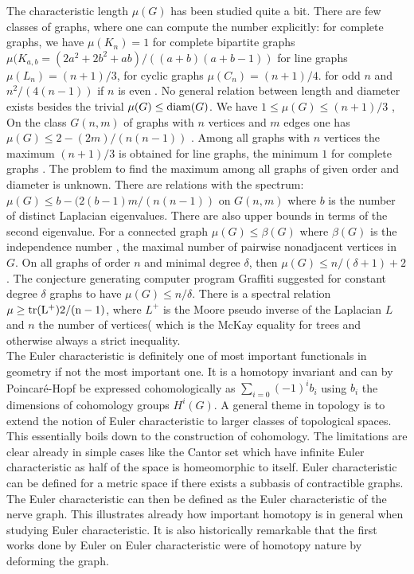 \documentclass[12pt]{amsart}
\theoremstyle{definition}
\def\tr{\rm{tr}} \def\Det{\rm{Det}} \def\ind{\rm{ind}} \def\dim{\rm{dim}} \def\ker{\rm{ker}}
\begin{document}
The characteristic length $\mu(G)$ has been studied quite a bit. There are few classes of
graphs, where one can compute the number explicitly: for complete graphs, we have 
$\mu(K_n)=1$ for complete bipartite graphs $\mu(K_{a,b} = (2a^2+2b^2+ab)/((a+b)(a+b-1))$
for line graphs $\mu(L_n) = (n+1)/3$, for cyclic graphs $\mu(C_n) = (n+1)/4$.
for odd $n$ and $n^2/(4 (n-1))$ if $n$ is even \cite{EntringerJacksonSnyder}.
No general relation between length and diameter exists besides the trivial $\mu(G) \leq {\rm diam}(G)$. 
We have $1 \leq \mu(G) \leq (n+1)/3$ \cite{DoyleGraver1},
On the class $G(n,m)$ of graphs with $n$ vertices and $m$ edges
one has $\mu(G) \leq 2 - (2m)/(n(n-1))$ \cite{EntringerJacksonSnyder}.
Among all graphs with $n$ vertices the maximum $(n+1)/3$ is obtained for line graphs, the minimum $1$ 
for complete graphs \cite{DoyleGraver1}. The problem to find the maximum among all graphs of given 
order and diameter is unknown. There are relations with the spectrum: $\mu(G) \leq b-(2(b-1)m/(n(n-1))$ on $G(n,m)$
where $b$ is the number of distinct Laplacian eigenvalues. There are also upper bounds in terms of the second
eigenvalue.  
For a connected graph $\mu(G) \leq \beta(G)$ where $\beta(G)$ is the independence number \cite{Chung1988},
the maximal number of pairwise nonadjacent vertices in $G$. 
On all graphs of order $n$ and minimal degree $\delta$, then $\mu(G) \leq n/(\delta + 1) + 2$ \cite{KouiderWinkler}.
The conjecture generating computer program Graffiti \cite{Fajtlowicz}
suggested for constant degree $\delta$ graphs to have $\mu(G) \leq n/\delta$.
There is a spectral relation$\mu \geq \tr(L^+) 2/(n-1)$, where
$L^+$ is the Moore pseudo inverse of the Laplacian $L$ and $n$ the number of vertices( \cite{Sivasubramanian}
which is the McKay equality for trees and otherwise always a strict inequality.  \\

The Euler characteristic is definitely one of most important functionals in geometry if not the 
most important one. It is a homotopy invariant and can by Poincar\'e-Hopf be expressed cohomologically 
as $\sum_{i=0} (-1)^i b_i$ using $b_i$ the dimensions of cohomology groups $H^i(G)$. 
A general theme in topology is to extend the notion of Euler characteristic to larger classes of 
topological spaces. This essentially boils down to the construction of cohomology. 
The limitations are clear already in simple cases like the Cantor set which  have
infinite Euler characteristic as half of the space is homeomorphic to itself. Euler characteristic 
can be defined for a metric space if there exists a subbasis of contractible graphs. The 
Euler characteristic can then be defined as the Euler characteristic of the nerve graph. This
illustrates already how important homotopy is in general when studying Euler characteristic.
It is also historically remarkable that the first works done by Euler on Euler characteristic 
were of homotopy nature by deforming the graph.  \\
\end{document}
